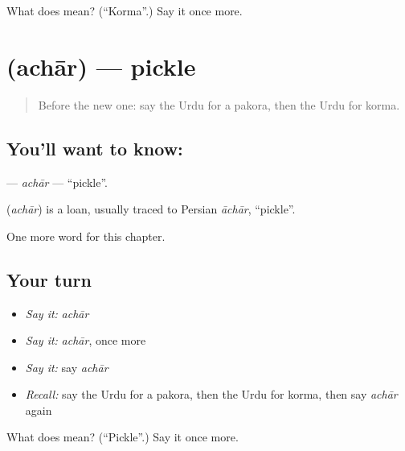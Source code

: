 \begin{tcolorbox}[breakable,colback=teal!4,colframe=teal!35!black,title={Before you move on}]
What does  mean? (\textquotedblleft{}Korma\textquotedblright{}.) Say it once more.
\end{tcolorbox}
\section[\texorpdfstring{\ur{اچار} (achār)}{اچار (achār)}]{ (achār) — pickle}

\label{lesson:UR-C200-achar}



\begin{quote}
Before the new one: say the Urdu for a pakora, then the Urdu for korma.
\end{quote}

\subsection*{You'll want to know: }
\textbf{} — \emph{achār} — \textquotedblleft{}pickle\textquotedblright{}.

\begin{cousinweb}
\textbf{} (\emph{achār}) is a loan, usually traced to Persian \emph{āchār}, \textquotedblleft{}pickle\textquotedblright{}.
\end{cousinweb}

\begin{grammarlens}[title={What you've built}]
One more word for this chapter.
\end{grammarlens}

\subsection*{Your turn}
\begin{itemize}
\raggedright
  \item \emph{Say it:} \emph{achār}
  \item \emph{Say it:} \emph{achār}, once more
  \item \emph{Say it:} say \emph{achār}
  \item \emph{Recall:} say the Urdu for a pakora, then the Urdu for korma, then say \emph{achār} again
\end{itemize}

\begin{tcolorbox}[breakable,colback=teal!4,colframe=teal!35!black,title={Before you move on}]
What does  mean? (\textquotedblleft{}Pickle\textquotedblright{}.) Say it once more.
\end{tcolorbox}
